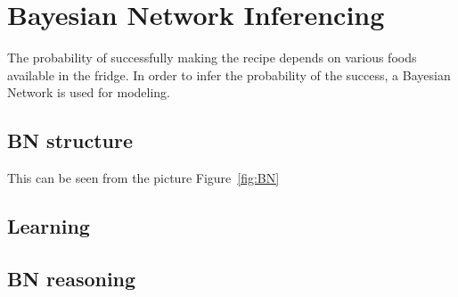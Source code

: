 \section{Bayesian Network Inferencing}
The probability of successfully making the recipe depends on various foods available in the fridge. In order to infer the probability of the success, a Bayesian Network is used for modeling.

\subsection{BN structure}
This can be seen from the picture Figure~\ref{fig:BN}
\subsection{Learning}

\subsection{BN reasoning}